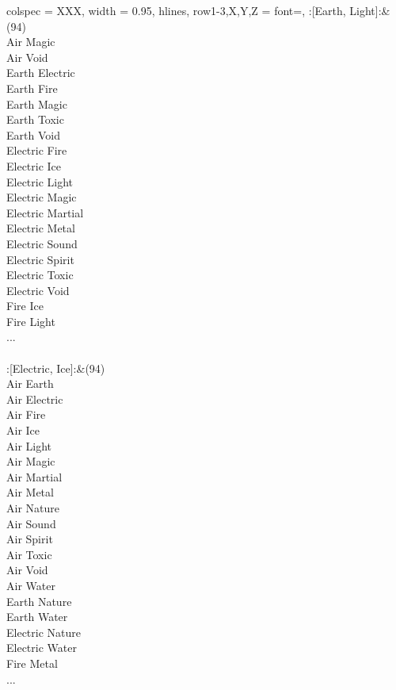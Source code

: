 \begin{longtblr}[
	caption = {2v2 Attacking Effective},
	label = {2v2-Attacking-Effective},
]{
	colspec = {XXX}, width = 0.95\linewidth,
	hlines,
	row{1-3,X,Y,Z} = {font=\bfseries},
}
	:[Earth, Light]:&{(94)\\
	Air Magic \\
	Air Void \\
	Earth Electric \\
	Earth Fire \\
	Earth Magic \\
	Earth Toxic \\
	Earth Void \\
	Electric Fire \\
	Electric Ice \\
	Electric Light \\
	Electric Magic \\
	Electric Martial \\
	Electric Metal \\
	Electric Sound \\
	Electric Spirit \\
	Electric Toxic \\
	Electric Void \\
	Fire Ice \\
	Fire Light \\
	...\\
	}\\

	:[Electric, Ice]:&{(94)\\
	Air Earth \\
	Air Electric \\
	Air Fire \\
	Air Ice \\
	Air Light \\
	Air Magic \\
	Air Martial \\
	Air Metal \\
	Air Nature \\
	Air Sound \\
	Air Spirit \\
	Air Toxic \\
	Air Void \\
	Air Water \\
	Earth Nature \\
	Earth Water \\
	Electric Nature \\
	Electric Water \\
	Fire Metal \\
	...\\
	}\\


\end{longtblr}
